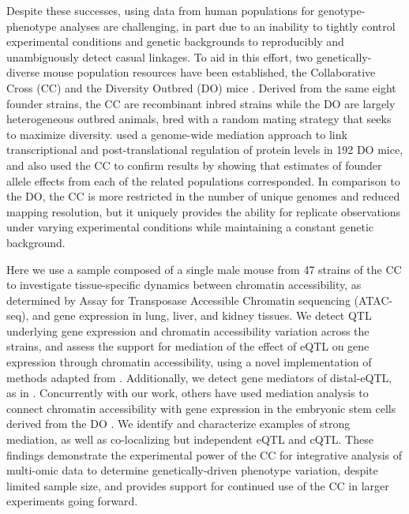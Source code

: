 Despite these successes, using data from human populations for genotype-phenotype analyses are challenging, in part due to an inability to tightly control experimental conditions and genetic backgrounds to reproducibly and unambiguously detect casual linkages. To aid in this effort, two genetically-diverse mouse population resources have been established, the Collaborative Cross (CC) \citep{Churchill2004,Hall2012,Srivastava2017} and the Diversity Outbred (DO) mice \citep{Churchill2012}. Derived from the same eight founder strains, the CC are recombinant inbred strains while the DO are largely heterogeneous outbred animals, bred with a random mating strategy that seeks to maximize diversity. \cite{Chick2016} used a genome-wide mediation approach to link transcriptional and post-translational regulation of protein levels in 192 DO mice, and also used the CC to confirm results by showing that estimates of founder allele effects from each of the related populations corresponded. In comparison to the DO, the CC is more restricted in the number of unique genomes and reduced mapping resolution, but it uniquely provides the ability for replicate observations under varying experimental conditions while maintaining a constant genetic background.

Here we use a sample composed of a single male mouse from 47 strains of the CC to investigate tissue-specific dynamics between chromatin accessibility, as determined by Assay for Transposase Accessible Chromatin sequencing (ATAC-seq), and gene expression in lung, liver, and kidney tissues. We detect QTL underlying gene expression and chromatin accessibility variation across the strains, and assess the support for mediation of the effect of eQTL on gene expression through chromatin accessibility, using a novel implementation of methods adapted from \cite{Chick2016}. Additionally, we detect gene mediators of distal-eQTL, as in \cite{Keller2018}. Concurrently with our work, others have used mediation analysis to connect chromatin accessibility with gene expression in the embryonic stem cells derived from the DO \citep{Skelly2019}. We identify and characterize examples of strong mediation, as well as co-localizing but independent eQTL and cQTL. These findings demonstrate the experimental power of the CC for integrative analysis of multi-omic data to determine genetically-driven phenotype variation, despite limited sample size, and provides support for continued use of the CC in larger experiments going forward.
